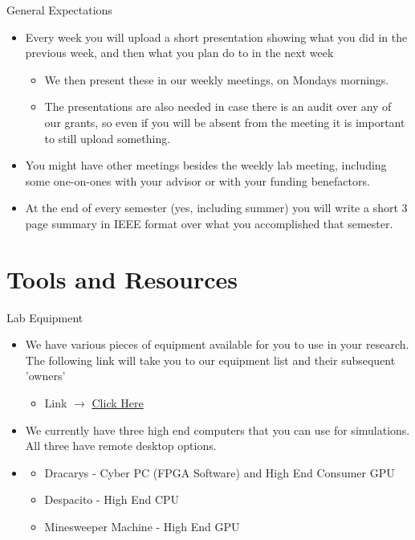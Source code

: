 \documentclass[handout]{beamer}
\begin{document}
\begin{frame}{General Expectations}
\begin{itemize}
  \item Every week you will upload a short presentation showing what you did in the previous week, and then what you plan do to in the next week 
  \begin{itemize}
      \item We then present these in our weekly meetings, on Mondays mornings. 
      \item The presentations are also needed in case there is an audit over any of our grants, so even if you will be absent from the meeting it is important to still upload something.
  \end{itemize}
  \item You might have other meetings besides the weekly lab meeting, including some one-on-ones with your advisor or with your funding benefactors.
  \item At the end of every semester (yes, including summer) you will write a short 3 page summary in IEEE format over what you accomplished that semester. 
\end{itemize}
\end{frame}

\section{Tools and Resources}
\begin{frame}{Lab Equipment}
\begin{itemize}
  \item We have various pieces of equipment available for you to use in your research. The following link will take you to our equipment list and their subsequent 'owners'
  \begin{itemize}
      \item Link $\rightarrow$ \href{https://mailuc-my.sharepoint.com/:x:/g/personal/jones2a5_mail_uc_edu/EXBe2QP-OvxGii-G5BHZC_cBd0Yh-bm_f038cyp-A_TBMQ?e=vjvvBS}{Click Here}
  \end{itemize}
  \item We currently have three high end computers that you can use for simulations. All three have remote desktop options.
  \item \begin{itemize}
      \item Dracarys - Cyber PC (FPGA Software) and High End Consumer GPU
      \item Despacito - High End CPU
      \item Minesweeper Machine - High End GPU 
  \end{itemize}
\end{itemize}
\end{frame}
\end{document}
